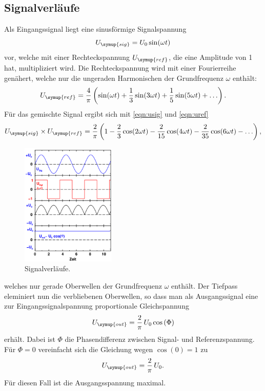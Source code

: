   \subsection{Signalverläufe}
  Als Eingangssignal liegt eine sinusförmige Signalspannung
  \begin{equation}
    U_\symup{sig} = U_0 \sin(\omega t)
    \label{eqn:usig}
  \end{equation}
  vor, welche mit einer Rechteckspannung $U_\symup{ref}$, die eine Amplitude von
  1 hat, multipliziert wird.
  Die Rechteckspannung wird mit einer Fourierreihe genähert, welche nur die ungeraden
  Harmonischen der Grundfrequenz $\omega$ enthält:
  \begin{equation}
    U_\symup{ref}=\frac{4}{\pi}\left(\sin(\omega t) + \frac{1}{3}\sin(3\omega t)
    + \frac{1}{5}\sin(5\omega t) + \ldots\right).
    \label{eqn:uref}
  \end{equation}
  Für das gemischte Signal ergibt sich mit \eqref{eqn:usig} und \eqref{eqn:uref}
  \begin{equation}
    U_\symup{sig}\times U_\symup{ref} = \frac{2}{\pi}\left(1-\frac{2}{3}\cos(2\omega t)
    -\frac{2}{15}\cos(4\omega t) -\frac{2}{35}\cos(6\omega t) - \ldots\right),
    \label{eqn:umisch}
  \end{equation}
  \begin{figure}
    \centering
    \vspace{-15pt}
    \includegraphics[width=0.4\textwidth]{signalverlaeufe.png}
    \caption{Signalverläufe\cite{sample}.}
    \label{fig:signalverlaeufe}
  \end{figure}
  welches nur gerade Oberwellen der Grundfrequenz $\omega$ enthält.
  Der Tiefpass eleminiert nun die verbliebenen Oberwellen, so dass man als Ausgangssignal
  eine zur Eingangssignalspannung proportionale Gleichspannung
  \begin{equation}
    U_\symup{out}=\frac{2}{\pi}\,U_0 \cos\,(\Phi)
    \label{eqn:uout1}
  \end{equation}
  erhält. Dabei ist $\Phi$ die Phasendifferenz zwischen Signal- und Referenzspannung.
  Für $\Phi = 0$ vereinfacht sich die Gleichung wegen $\cos(0)=1$ zu
  \begin{equation}
    U_\symup{out}=\frac{2}{\pi}\,U_0.
    \label{eqn:uout2}
  \end{equation}
  Für diesen Fall ist die Ausgangsspannung maximal.
\cite{sample}
